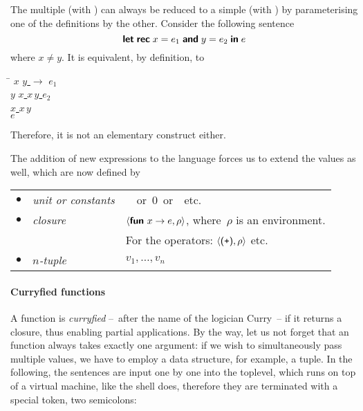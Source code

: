 The multiple \Xlet{} \Xrec{} (with \Xand) can always be reduced to a
simple \Xlet{} \Xrec{} (with \Xin) by parameterising one of the
definitions by the other. Consider the following sentence
\begin{equation*}
\textsf{\textbf{let}} \; \textsf{\textbf{rec}} \; x \; \textsf{=} \; e_1 \; \textsf{\textbf{and}} \; y \; \textsf{=} \; e_2 \;
\textsf{\textbf{in}} \; e
\end{equation*}
where $x \neq y$. It is equivalent, by definition, to
\begin{center}
\begin{minipage}{0.3\linewidth}
\begin{tabbing}
\Xlet{} \= \Xrec{} $x$ \equal{} \underline{\Xfun{} $y$
  $\rightarrow$} $e_1$ \Xin\\
\> \Xlet{} \Xrec{} $y$ \equal{} \underline{\Xlet{} $x$ \equal{} $x \,
y$ \Xin} $e_2$ \Xin\\
\> \underline{\Xlet{} $x$ \equal{} $x \, y$}\\
\underline{\Xin} $e$
\end{tabbing}
\end{minipage}
\end{center}
Therefore, it is not an elementary construct either.

The addition of new expressions to the language forces us to extend
the values as well, which are now defined by

\bigskip

\begin{tabular}{rll}
    $\bullet$
  & \emph{unit or constants}
  & \unit \ or \textsf{0} or \Xtrue{} etc.\\
    $\bullet$
  & \emph{closure}
  & $\langle\textsf{\textbf{fun}} \,\, x \rightarrow e, \rho\rangle$, where~$\rho$ is
    an environment.\\
  & 
  & For the operators: $\langle\textsf{(}{\texttt{+}}\textsf{)}, \rho\rangle$
    etc.\\
    $\bullet$
  & \emph{$n$-tuple}
  & $v_1, \ldots, v_n$
\end{tabular}

\bigskip

\paragraph{Curryfied functions}

A function is \emph{curryfied} --~after the name of the logician
Curry~-- if it returns a closure, thus enabling partial
applications. By the way, let us not forget that an \OCaml function
always takes exactly one argument: if we wish to simultaneously pass
multiple values, we have to employ a data structure, for example, a
tuple. In the following, the sentences are input one by one into
the \OCaml toplevel, which runs on top of a virtual machine, like
the \Erlang shell does, therefore they are terminated with a special
token, two semicolons:

